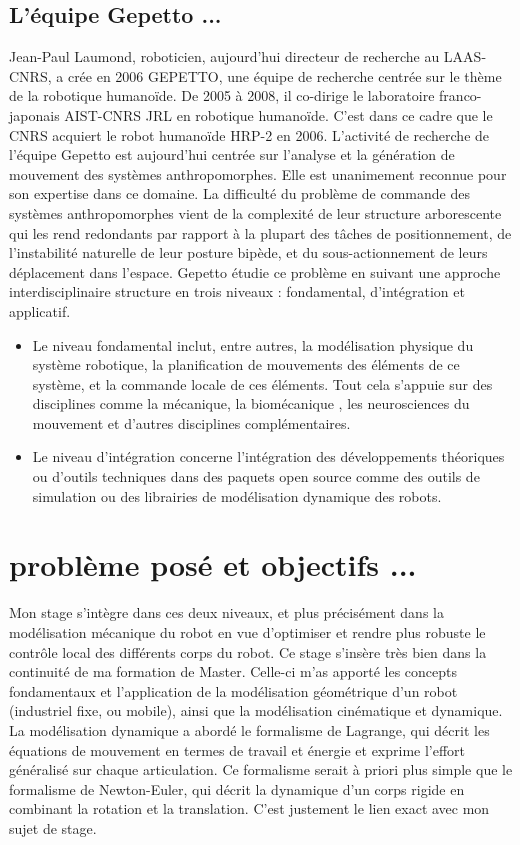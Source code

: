\documentclass{report}
\begin{document}
\subsection*{L'équipe Gepetto ...}
Jean-Paul Laumond, roboticien, aujourd'hui directeur de recherche au LAAS-CNRS, a crée en 2006 GEPETTO, une équipe de recherche centrée sur le thème de la robotique humanoïde. De 2005 à 2008, il co-dirige le laboratoire franco-japonais AIST-CNRS JRL en robotique humanoïde. C’est dans ce cadre que le CNRS acquiert le robot humanoïde HRP-2 en 2006. L’activité de recherche de l’équipe Gepetto est aujourd'hui centrée sur l’analyse et la génération de mouvement des systèmes anthropomorphes. Elle est unanimement reconnue pour son expertise dans ce domaine. La difficulté du problème de commande des systèmes anthropomorphes vient de la complexité de leur structure arborescente qui les rend redondants par rapport à la plupart des tâches de positionnement, de l’instabilité naturelle de leur posture bipède, et du sous-actionnement de leurs déplacement dans l’espace. Gepetto étudie ce problème en suivant une approche interdisciplinaire structure en trois niveaux :  fondamental,  d'intégration et applicatif.
\begin{itemize}
\item Le niveau fondamental inclut, entre autres, la modélisation physique du système robotique, la planification de mouvements des éléments de ce système, et la commande locale de ces éléments. Tout cela s'appuie sur des disciplines comme la mécanique, la biomécanique , les neurosciences du mouvement et d'autres disciplines complémentaires.
\item Le niveau d'intégration concerne l'intégration des développements théoriques ou d'outils techniques dans des paquets open source comme des outils de simulation ou des librairies de modélisation dynamique des robots.
\end{itemize}

\section*{problème posé et objectifs ...}

Mon stage s'intègre dans ces deux niveaux, et plus précisément dans la modélisation mécanique du robot en vue d'optimiser et rendre plus robuste le contrôle local des différents corps du robot. Ce stage s'insère très bien dans la continuité de ma formation de Master. Celle-ci m'as apporté les concepts fondamentaux et l'application de la modélisation géométrique d'un robot (industriel fixe, ou mobile), ainsi que la modélisation cinématique et dynamique. La modélisation dynamique a abordé le formalisme de Lagrange, qui décrit les équations de mouvement en termes de travail et énergie et exprime l'effort généralisé sur chaque articulation. Ce formalisme serait à priori plus simple que le formalisme de Newton-Euler, qui décrit la dynamique d'un corps rigide en combinant la rotation et la translation. C'est justement le lien exact avec mon sujet de stage.
\end{document}
